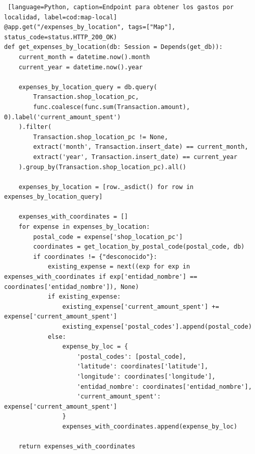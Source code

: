 \begin{lstlisting} [language=Python, caption=Endpoint para obtener los gastos por localidad, label=cod:map-local]
@app.get("/expenses_by_location", tags=["Map"], status_code=status.HTTP_200_OK)
def get_expenses_by_location(db: Session = Depends(get_db)):
    current_month = datetime.now().month
    current_year = datetime.now().year

    expenses_by_location_query = db.query(
        Transaction.shop_location_pc,
        func.coalesce(func.sum(Transaction.amount), 0).label('current_amount_spent')
    ).filter(
        Transaction.shop_location_pc != None,
        extract('month', Transaction.insert_date) == current_month,
        extract('year', Transaction.insert_date) == current_year
    ).group_by(Transaction.shop_location_pc).all()

    expenses_by_location = [row._asdict() for row in expenses_by_location_query]

    expenses_with_coordinates = []
    for expense in expenses_by_location:
        postal_code = expense['shop_location_pc']
        coordinates = get_location_by_postal_code(postal_code, db)
        if coordinates != {"desconocido"}:
            existing_expense = next((exp for exp in expenses_with_coordinates if exp['entidad_nombre'] == coordinates['entidad_nombre']), None)
            if existing_expense:
                existing_expense['current_amount_spent'] += expense['current_amount_spent']
                existing_expense['postal_codes'].append(postal_code)
            else:
                expense_by_loc = {
                    'postal_codes': [postal_code],
                    'latitude': coordinates['latitude'],
                    'longitude': coordinates['longitude'],
                    'entidad_nombre': coordinates['entidad_nombre'],
                    'current_amount_spent': expense['current_amount_spent']
                }
                expenses_with_coordinates.append(expense_by_loc)

    return expenses_with_coordinates
\end{lstlisting}

